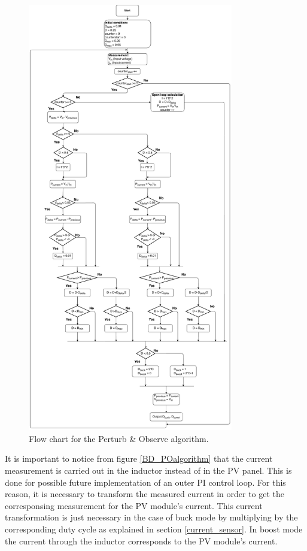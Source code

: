 \begin{figure}[H]
	\begin{center}
		\includegraphics[width=0.8\textwidth]{../Pictures/P1/Flow_chart/2018_11_15_Flow_chart_MPPT_Buck-Boost_converter}
		\caption{Flow chart for the Perturb \& Observe algorithm.}
		\label{fcfinal}
	\end{center}	
\end{figure}

It is important to notice from figure \ref{BD_POalgorithm} that the current measurement is carried out in the inductor instead of in the PV panel. This is done for possible future implementation of an outer PI control loop. For this reason, it is necessary to transform the measured current in order to get the corresponsing measurement for the PV module's current. This current transformation is just necessary in the case of buck mode by multiplying by the corresponding duty cycle as explained in section \ref{current_sensor}. In boost mode the current through the inductor corresponds to the PV module's current. 


